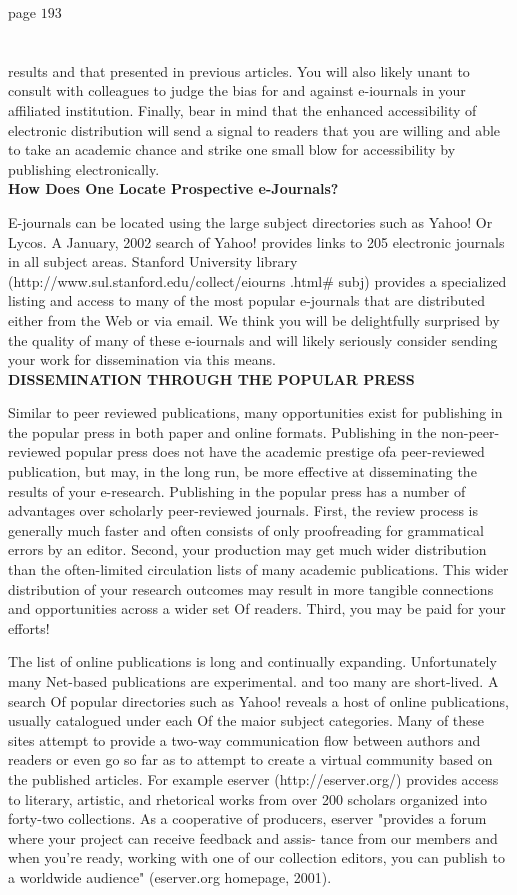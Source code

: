 \documentclass{book}
\begin{document}
page $193$\\\\\\
results and that presented in previous articles. You will also likely unant to consult with colleagues to judge the bias for and against e-iournals in your affiliated institution. Finally, bear in mind that the enhanced accessibility of electronic distribution will send a signal to readers that you are willing and able to take an academic chance and strike one small blow for accessibility by publishing electronically.\\
\textbf{How Does One Locate Prospective e-Journals?}\par 
 E-journals can be located using the large subject directories such as Yahoo! Or Lycos. A January, 2002 search of Yahoo! provides links to 205 electronic journals in all subject areas. Stanford University library (http://www.sul.stanford.edu/collect/eiourns .html\# subj) provides a specialized listing and access to many of the most popular e-journals that are distributed either from the Web or via email. We think you will be delightfully surprised by the quality of many of these e-iournals and will likely seriously consider sending your work for dissemination via this means.\\
\textbf{DISSEMINATION THROUGH THE POPULAR PRESS}\par  
Similar to peer reviewed publications, many opportunities exist for publishing in the popular press in both paper and online formats. Publishing in the non-peer-reviewed popular press does not have the academic prestige ofa peer-reviewed publication, but may, in the long run, be more effective at disseminating the results of your e-research. Publishing in the popular press has a number of advantages over scholarly peer-reviewed journals. First, the review process is generally much faster and often consists of only proofreading for grammatical errors by an editor. Second, your production may get much wider distribution than the often-limited circulation lists of many academic publications. This wider distribution of your research outcomes may result in more tangible connections and opportunities across a wider set Of readers. Third, you may be paid for your efforts!\par 
The list of online publications is long and continually expanding. Unfortunately many Net-based publications are experimental. and too many are short-lived. A search Of popular directories such as Yahoo! reveals a host of online publications, usually catalogued under each Of the maior subject categories. Many of these sites attempt to provide a two-way communication flow between authors and readers or even go so far as to attempt to create a virtual community based on the published articles. For example eserver (http://eserver.org/) provides access to literary, artistic, and rhetorical works from over 200 scholars organized into forty-two collections. As a cooperative of producers, eserver "provides a forum where your project can receive feedback and assis- tance from our members and when you're ready, working with one of our collection editors, you can publish to a worldwide audience" (eserver.org homepage, 2001).\par 
\end{document}
